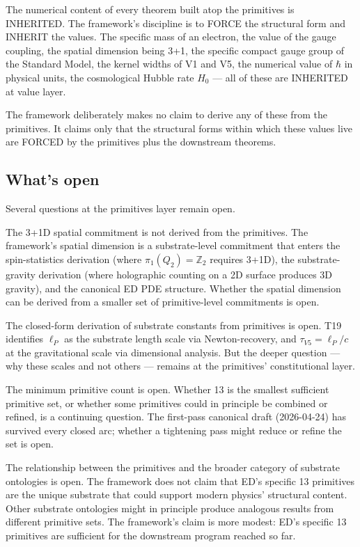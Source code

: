 \documentclass[11pt,a4paper]{article}
\begin{document}
The numerical content of every theorem built atop the primitives is INHERITED. The framework's discipline is to FORCE the structural form and INHERIT the values. The specific mass of an electron, the value of the gauge coupling, the spatial dimension being 3+1, the specific compact gauge group of the Standard Model, the kernel widths of V1 and V5, the numerical value of $\hbar$ in physical units, the cosmological Hubble rate $H_0$ --- all of these are INHERITED at value layer.

The framework deliberately makes no claim to derive any of these from the primitives. It claims only that the structural forms within which these values live are FORCED by the primitives plus the downstream theorems.

\subsection{What's open}

Several questions at the primitives layer remain open.

The 3+1D spatial commitment is not derived from the primitives. The framework's spatial dimension is a substrate-level commitment that enters the spin-statistics derivation (where $\pi_1(Q_2) = \mathbb{Z}_2$ requires 3+1D), the substrate-gravity derivation (where holographic counting on a 2D surface produces 3D gravity), and the canonical ED PDE structure. Whether the spatial dimension can be derived from a smaller set of primitive-level commitments is open.

The closed-form derivation of substrate constants from primitives is open. T19 identifies $\ell_P$ as the substrate length scale via Newton-recovery, and $\tau_{V5} = \ell_P/c$ at the gravitational scale via dimensional analysis. But the deeper question --- why these scales and not others --- remains at the primitives' constitutional layer.

The minimum primitive count is open. Whether 13 is the smallest sufficient primitive set, or whether some primitives could in principle be combined or refined, is a continuing question. The first-pass canonical draft (2026-04-24) has survived every closed arc; whether a tightening pass might reduce or refine the set is open.

The relationship between the primitives and the broader category of substrate ontologies is open. The framework does not claim that ED's specific 13 primitives are the unique substrate that could support modern physics' structural content. Other substrate ontologies might in principle produce analogous results from different primitive sets. The framework's claim is more modest: ED's specific 13 primitives are sufficient for the downstream program reached so far.
\end{document}
